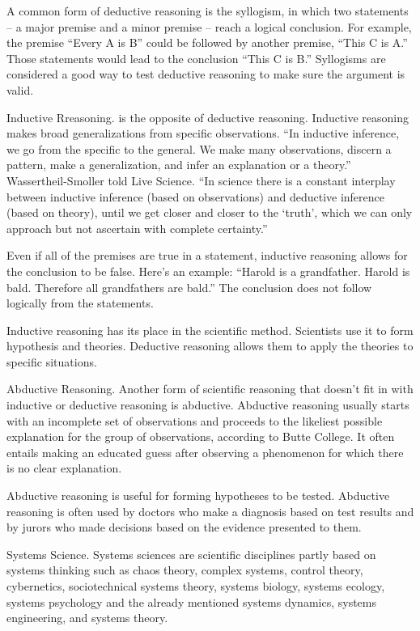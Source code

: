 A common form of deductive reasoning is the syllogism, in which two statements – a major premise and a minor premise – reach a logical conclusion. For example, the premise ``Every A is B'' could be followed by another premise, ``This C is A.''  Those statements would lead to the conclusion ``This C is B.'' Syllogisms are considered a good way to test deductive reasoning to make sure the argument is valid.

Inductive Rreasoning. is the opposite of deductive reasoning. Inductive reasoning makes broad generalizations from specific observations. ``In inductive inference, we go from the specific to the general. We make many observations, discern a pattern, make a generalization, and infer an explanation or a theory.'' Wassertheil-Smoller told Live Science. ``In science there is a constant interplay between inductive inference (based on observations) and deductive inference (based on theory), until we get closer and closer to the `truth', which we can only approach but not ascertain with complete certainty.''

Even if all of the premises are true in a statement, inductive reasoning allows for the conclusion to be false. Here’s an example: ``Harold is a grandfather. Harold is bald. Therefore all grandfathers are bald.''  The conclusion does not follow logically from the statements.

Inductive reasoning has its place in the scientific method. Scientists use it to form hypothesis and theories. Deductive reasoning allows them to apply the theories to specific situations.

Abductive Reasoning. Another form of scientific reasoning that doesn’t fit in with inductive or deductive reasoning is abductive. Abductive reasoning usually starts with an incomplete set of observations and proceeds to the likeliest possible explanation for the group of observations, according to Butte College. It often entails making an educated guess after observing a phenomenon for which there is no clear explanation.

Abductive reasoning is useful for forming hypotheses to be tested. Abductive reasoning is often used by doctors who make a diagnosis based on test results and by jurors who made decisions based on the evidence presented to them.

Systems Science. Systems sciences are scientific disciplines partly based on systems thinking such as chaos theory, complex systems, control theory, cybernetics, sociotechnical systems theory, systems biology, systems ecology, systems psychology and the already mentioned systems dynamics, systems engineering, and systems theory.

